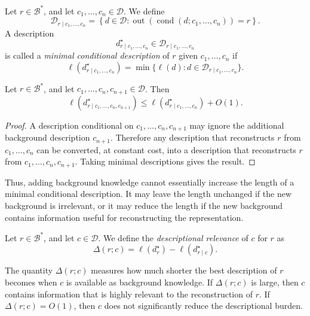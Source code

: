 \begin{definition}
\label{def:conditional_description_multiple_backgrounds}
Let \(r\in\mathcal B^\ast\), and let \(c_1,\ldots,c_n\in\mathcal D\). We define
\[
\mathcal D_{r\mid c_1,\ldots,c_n}
=
\left\{
d\in\mathcal D:
\operatorname{out}(\operatorname{cond}(d;c_1,\ldots,c_n))=r
\right\}.
\]
A description
\[
d^\star_{r\mid c_1,\ldots,c_n}\in
\mathcal D_{r\mid c_1,\ldots,c_n}
\]
is called a \emph{minimal conditional description} of \(r\) given
\(c_1,\ldots,c_n\) if
\[
\ell(d^\star_{r\mid c_1,\ldots,c_n})
=
\min
\{
\ell(d):d\in\mathcal D_{r\mid c_1,\ldots,c_n}
\}.
\]
\end{definition}

\begin{proposition}
\label{prop:conditional_monotonicity}
Let \(r\in\mathcal B^\ast\), and let \(c_1,\ldots,c_n,c_{n+1}\in\mathcal D\).
Then
\[
\ell(d^\star_{r\mid c_1,\ldots,c_n,c_{n+1}})
\leq
\ell(d^\star_{r\mid c_1,\ldots,c_n})+O(1).
\]
\end{proposition}

\begin{proof}
A description conditional on \(c_1,\ldots,c_n,c_{n+1}\) may ignore the
additional background description \(c_{n+1}\). Therefore any description that
reconstructs \(r\) from \(c_1,\ldots,c_n\) can be converted, at constant cost,
into a description that reconstructs \(r\) from
\(c_1,\ldots,c_n,c_{n+1}\). Taking minimal descriptions gives the result.
\end{proof}

Thus, adding background knowledge cannot essentially increase the length of a
minimal conditional description. It may leave the length unchanged if the new
background is irrelevant, or it may reduce the length if the new background
contains information useful for reconstructing the representation.

\begin{definition}
\label{def:background_relevance}
Let \(r\in\mathcal B^\ast\), and let \(c\in\mathcal D\). We define the
\emph{descriptional relevance} of \(c\) for
\(r\) as
\[
\Delta(r;c)
=
\ell(d^\star_r)-\ell(d^\star_{r\mid c}).
\]
\end{definition}

The quantity \(\Delta(r;c)\) measures how much shorter the best description of
\(r\) becomes when \(c\) is available as background knowledge. If
\(\Delta(r;c)\) is large, then \(c\) contains information that is highly
relevant to the reconstruction of \(r\). If \(\Delta(r;c)=O(1)\), then \(c\)
does not significantly reduce the descriptional burden.

